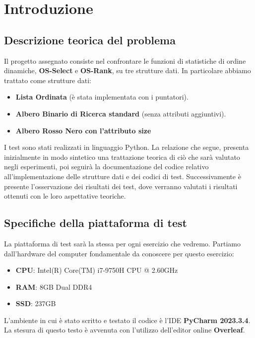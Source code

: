 \documentclass[10pt]{article}
\begin{document}
\tableofcontents
\listoffigures
\listoftables
\newpage

\section{Introduzione}
\label{introduzione}
\subsection{Descrizione teorica del problema}
Il progetto assegnato consiste nel confrontare le funzioni di statistiche di ordine dinamiche, \textbf{OS-Select} e \textbf{OS-Rank}, su tre strutture dati.
In particolare abbiamo trattato come strutture dati:
\begin{itemize}
\item \textbf{Lista Ordinata} (è stata implementata con i puntatori).
\item \textbf{Albero Binario di Ricerca standard} (senza attributi aggiuntivi).
\item \textbf{Albero Rosso Nero con l'attributo size}
\end{itemize}
I test sono stati realizzati in linguaggio Python. 
\newline
La relazione che segue, presenta inizialmente in modo sintetico una trattazione teorica di ciò che sarà valutato negli esperimenti, poi seguirà la documentazione del codice relativo all'implementazione delle strutture dati e dei codici di test.
Successivamente è presente l’osservazione dei risultati dei test, dove verranno valutati i risultati ottenuti con le loro aspettative teoriche.

\subsection{Specifiche della piattaforma di test}
La piattaforma di test sarà la stessa per ogni esercizio che vedremo. Partiamo dall’hardware del computer fondamentale da conoscere per questo esercizio:
\begin{itemize}
    \item \textbf{CPU}: Intel(R) Core(TM) i7-9750H CPU @ 2.60GHz
    \item \textbf{RAM}: 8GB Dual DDR4 
    \item \textbf{SSD}: 237GB
\end{itemize}
L'ambiente in cui è stato scritto e testato il codice è l'IDE \textbf{PyCharm 2023.3.4}. La stesura di questo testo è avvenuta con l'utilizzo dell'editor online \textbf{Overleaf}.
\newpage
\end{document}
